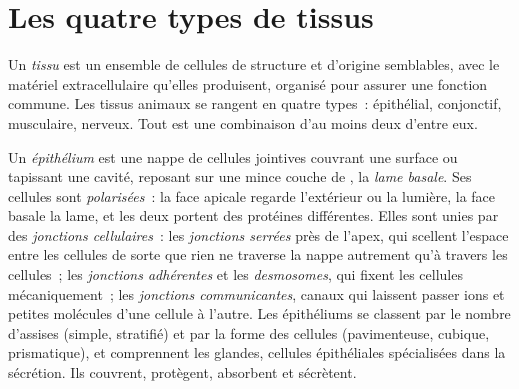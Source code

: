 \section{Les quatre types de tissus}

\begin{definition}[Tissu]\label{def:b1:body-plans-tissues:tissue}
Un \emph{tissu} est un ensemble de cellules de structure et
d'origine semblables, avec le matériel extracellulaire qu'elles
produisent, organisé pour assurer une fonction commune. Les tissus
animaux se rangent en quatre types~: épithélial, conjonctif, musculaire,
nerveux. Tout  est une combinaison d'au moins deux d'entre eux.
\end{definition}

\begin{definition}\label{def:b1:body-plans-tissues:epithelium}
Un \emph{épithélium} est une nappe de cellules
jointives couvrant une surface ou tapissant une cavité, reposant sur une
mince couche de , la \emph{lame
basale}. Ses cellules sont
\emph{polarisées}~: la face apicale regarde
l'extérieur ou la lumière, la face basale la lame, et les deux portent
des protéines différentes. Elles sont unies par des \emph{jonctions
cellulaires}~: les \emph{jonctions serrées}
près de l'apex, qui scellent l'espace entre les cellules de sorte que
rien ne traverse la nappe autrement qu'à travers les cellules~; les
\emph{jonctions adhérentes} et les \emph{desmosomes}, qui fixent les
cellules mécaniquement~; les \emph{jonctions communicantes}, canaux qui
laissent passer ions et petites molécules d'une cellule à l'autre. Les
épithéliums se classent par le nombre d'assises (simple, stratifié) et
par la forme des cellules (pavimenteuse, cubique, prismatique), et
comprennent les glandes, cellules épithéliales spécialisées dans la
sécrétion. Ils couvrent, protègent, absorbent et sécrètent.
\end{definition}


